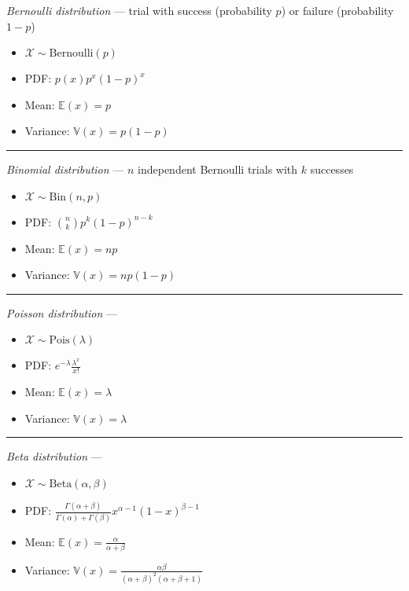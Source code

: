 \emph{Bernoulli distribution} --- trial with success (probability $p$) or failure (probability $1-p$)
\begin{multicols}{2}
\begin{itemize}
    \item $\mathcal{X} \sim \textrm{Bernoulli}(p)$
    \item PDF: $p(x) p^x (1-p)^x$
    \item Mean: $\mathbb{E}(x) = p$
    \item Variance: $\mathbb{V}(x) = p(1-p)$
\end{itemize}
\end{multicols}

{\color{lightgray}\hrule height 0.001mm}

\emph{Binomial distribution} --- $n$ independent Bernoulli trials with $k$ successes
\begin{multicols}{2}
\begin{itemize}
    \item $\mathcal{X} \sim \textrm{Bin}(n,p)$
    \item PDF: $\binom{n}{k} p^k (1-p)^{n-k}$
    \item Mean: $\mathbb{E}(x) = np$
    \item Variance: $\mathbb{V}(x) = np(1-p)$
\end{itemize}
\end{multicols}

{\color{lightgray}\hrule height 0.001mm}

\emph{Poisson distribution} ---
\begin{multicols}{2}
\begin{itemize}
    \item $\mathcal{X} \sim \textrm{Pois}(\lambda)$
    \item PDF: $e^{-\lambda} \frac{\lambda^x}{x!}$
    \item Mean: $\mathbb{E}(x) = \lambda$
    \item Variance: $\mathbb{V}(x) = \lambda$
\end{itemize}
\end{multicols}

{\color{lightgray}\hrule height 0.001mm}

\emph{Beta distribution} ---
\begin{multicols}{2}
\begin{itemize}
    \item $\mathcal{X} \sim \textrm{Beta}(\alpha,\beta)$
    \item PDF: $\frac{\Gamma(\alpha+\beta)}{\Gamma(\alpha)+\Gamma(\beta)} x^{\alpha-1} (1-x)^{\beta-1}$
    \item Mean: $\mathbb{E}(x) = \frac{\alpha}{\alpha+\beta}$
    \item Variance: $\mathbb{V}(x) = \frac{\alpha\beta}{(\alpha+\beta)^2(\alpha+\beta+1)}$
\end{itemize}
\end{multicols}


